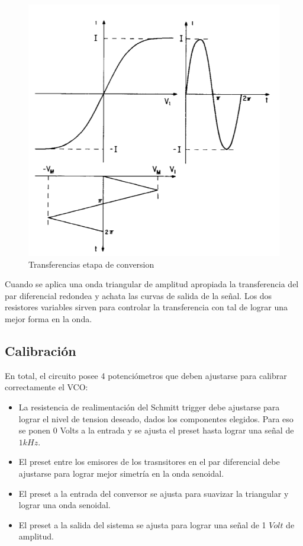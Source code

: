 \begin{figure}[H]	
	\centering
	\includegraphics[width=1\textwidth]{Imagenes_Ej3/func.png}
	\caption{Transferencias etapa de conversion}
	\label{fig:linealizacion}
\end{figure}

Cuando se aplica una onda triangular de amplitud apropiada la transferencia del par diferencial redondea y achata las curvas de salida de la señal. Los dos resistores variables sirven para controlar la transferencia con tal de lograr una mejor forma en la onda. 

\subsection{Calibración}

En total, el circuito posee 4 potenciómetros que deben ajustarse para calibrar correctamente el VCO:


\begin{itemize}
\item La resistencia de realimentación del Schmitt trigger debe ajustarse para lograr el nivel de tension deseado, dados los componentes elegidos. Para eso se ponen 0 Volts a la entrada y se ajusta el preset hasta lograr una señal de $1kHz$.
\item El preset entre los emisores de los trasnsitores en el par diferencial debe ajustarse para lograr mejor simetría en la onda senoidal.
\item El preset a la entrada del conversor se ajusta para suavizar la triangular y lograr una onda senoidal.
\item El preset a la salida del sistema se ajusta para lograr una señal de 1 $Volt$ de amplitud. 
\end{itemize}


